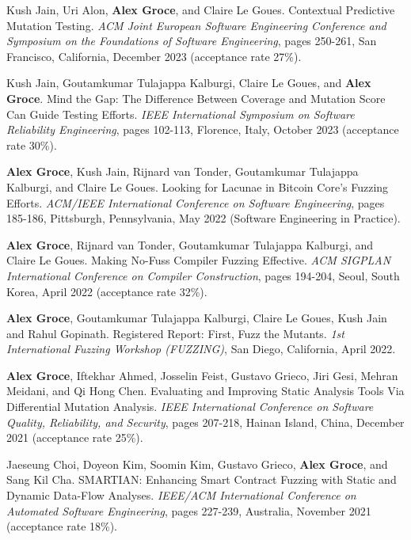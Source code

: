 \documentclass[ComputerScience]{vita}
\begin{document}
\begin{vita}
\begin{Refereed Conference and Workshop Publications}
\item Kush Jain, Uri Alon, {\bf Alex Groce}, and Claire Le Goues.
    \newblock Contextual Predictive Mutation Testing.
    \newblock \emph{ACM Joint European Software Engineering
Conference and Symposium on the Foundations of Software Engineering},
pages 250-261, San Francisco, California, December 2023  (acceptance rate 27\%).

\item Kush Jain, Goutamkumar Tulajappa Kalburgi, Claire Le Goues, and {\bf Alex Groce}. 
    \newblock Mind the Gap: The Difference Between Coverage and Mutation Score Can Guide Testing Efforts. 
    \newblock \emph{IEEE International Symposium on Software Reliability
  Engineering}, 
pages 102-113, Florence, Italy, October 2023  (acceptance rate 30\%). 


\item {\bf Alex Groce}, Kush Jain, Rijnard van Tonder, Goutamkumar
    Tulajappa Kalburgi, and Claire Le Goues.
    \newblock Looking for Lacunae in Bitcoin Core’s Fuzzing Efforts.
    \newblock \emph{ACM/IEEE International Conference on Software
      Engineering}, pages 185-186, Pittsburgh,
    Pennsylvania, May 2022 (Software Engineering in Practice).
    
\item {\bf Alex Groce}, Rijnard van Tonder, Goutamkumar
  Tulajappa Kalburgi, and Claire Le Goues.
  \newblock Making No-Fuss Compiler Fuzzing Effective.
  \newblock \emph{ACM SIGPLAN International Conference
on Compiler Construction}, pages 194-204, Seoul, South
Korea, April 2022 (acceptance rate 32\%).

\item {\bf Alex Groce}, Goutamkumar
  Tulajappa Kalburgi, Claire Le Goues, Kush Jain and Rahul Gopinath.
  \newblock Registered Report: First, Fuzz the Mutants.
  \newblock \emph{1st International Fuzzing Workshop (FUZZING)}, San Diego, California, April 2022.

\item {\bf Alex Groce}, Iftekhar Ahmed, Josselin Feist, Gustavo
  Grieco, Jiri Gesi, Mehran Meidani, and Qi Hong Chen.
  \newblock Evaluating and Improving Static Analysis Tools Via
  Differential Mutation Analysis.
  \newblock \emph{IEEE International Conference on Software
Quality, Reliability, and Security}, pages 207-218, Hainan
Island, China, December 2021 (acceptance rate 25\%).
  
\item Jaeseung Choi, Doyeon Kim, Soomin Kim, Gustavo Grieco, {\bf Alex Groce}, and Sang Kil Cha.
\newblock SMARTIAN: Enhancing Smart Contract Fuzzing with Static and Dynamic Data-Flow Analyses.
\newblock \emph{IEEE/ACM International Conference on Automated Software
  Engineering}, pages 227-239, Australia, November 2021 (acceptance rate 18\%).


\end{Refereed Conference and Workshop Publications}
\end{vita}
\end{document}

